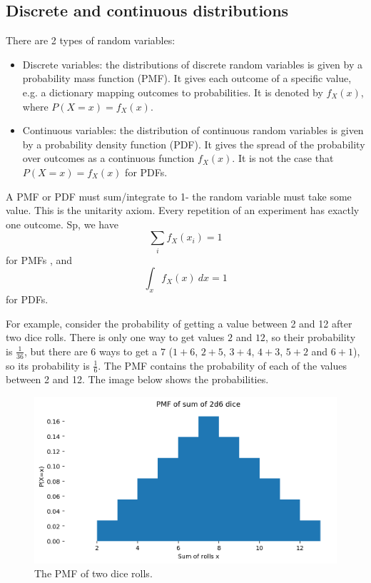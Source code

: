 \documentclass[a4paper, openany]{memoir}
\begin{document}
\subsection{Discrete and continuous distributions}
There are 2 types of random variables:
\begin{itemize}
    \item Discrete variables: the distributions of discrete random variables is given by a probability mass function (PMF). It gives each outcome of a specific value, e.g. a dictionary mapping outcomes to probabilities. It is denoted by $f_X(x)$, where $P(X = x) = f_X(x)$.
    \item Continuous variables: the distribution of continuous random variables is given by a probability density function (PDF). It gives the spread of the probability over outcomes as a continuous function $f_X(x)$. It is not the case that $P(X = x) = f_X(x)$ for PDFs.
\end{itemize}

A PMF or PDF must sum/integrate to 1- the random variable must take some value. This is the unitarity axiom. Every repetition of an experiment has exactly one outcome. Sp, we have
\[\sum_i f_X(x_i) = 1\]
for PMFs , and
\[\int_x f_X(x) \ dx = 1\]
for PDFs.

For example, consider the probability of getting a value between 2 and 12 after two dice rolls. There is only one way to get values $2$ and $12$, so their probability is $\frac{1}{36}$, but there are 6 ways to get a $7$ ($1 + 6$, $2 + 5$, $3 + 4$, $4 + 3$, $5 + 2$ and $6 + 1$), so its probability is $\frac{1}{6}$. The PMF contains the probability of each of the values between 2 and 12. The image below shows the probabilities.
\begin{figure}[H]
    \centering
    \includegraphics[scale=0.6]{src/5.1 pmf of sum 2d6 dice.png}
    \caption{The PMF of two dice rolls.}
\end{figure}
\newpage
\end{document}
